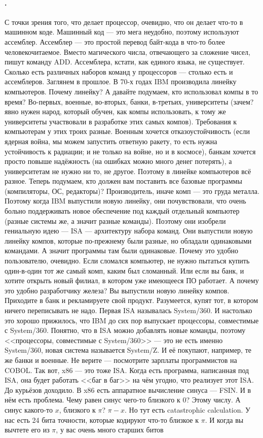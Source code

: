\documentclass{article}
\begin{document}
    \paragraph{.}
    С точки зрения того, что делает процессор, очевидно, что он делает что-то в машинном коде. Машинный код --- это мега неудобно, поэтому используют ассемблер. Ассемблер --- это простой перевод байт-кода в что-то более человекочитаемое. Вместо магического числа, отвечающего за сложение чисел, пишут команду ADD. Ассемблера, кстати, как единого языка, не существует. Сколько есть различных наборов команд у процессоров --- столько есть и ассемблеров. Заглянем в прошлое. В 70-х годах IBM производила линейку компьютеров. Почему линейку? А давайте подумаем, кто использовал компы в то время? Во-первых, военные, во-вторых, банки, в-третьих, университеты (зачем? явно нужен народ, который обучен, как компы использовать, к тому же университеты участвовали в разработке этих самых компов). Требования к компьютерам у этих троих разные. Военным хочется отказоустойчивость (если ядерная война, мы можем запустить ответную ракету, то есть нужна устойчивость к радиации; и не только на войне, но и в космосе), банкам хочется просто повыше надёжность (на ошибках можно много денег потерять), а университетам не нужно ни то, не другое. Поэтому в линейке компьютеров всё разное. Теперь подумаем, кто должен вам поставить все базовые программы (компиляторы, ОС, редакторы)? Производитель, иначе комп --- это груда металла. Поэтому когда IBM выпустили новую линейку, они почувствовали, что очень больно поддерживать новое обеспечение под каждый отдельный компьютер (разные системы же, а значит разные команды). Поэтому они изобрели гениальную идею --- ISA --- архитектуру набора команд. Они выпустили новую линейку компов, которые по-прежнему были разные, но обладали одинаковыми командами. А значит программы там были одинаковые. Почему это удобно пользователю, очевидно. Если сломался компьютер, не нужно пытаться купить один-в-один тот же самый комп, каким был сломанный. Или если вы банк, и хотите открыть новый филиал, в котором уже имеющееся ПО работает. А почему это удобно разработчику железа? Вы выпустили новую линейку компов. Приходите в банк и рекламируете свой продукт. Разумеется, купят тот, в котором ничего переписывать не надо. Первая ISA называлась System/360. И настолько это хорошо прижилось, что IBM до сих пор выпускает процессоры, совместимые с System/360. Понятно, что в ISA можно добавлять новые команды, поэтому <<процессоры, совместимые с System/360>> --- это не есть именно System/360, новая система называется System/Z. И её покупают, например, те же банки и военные. Не верите --- посмотрите зарплаты программистов на COBOL. Так вот, x86 --- это тоже ISA. Когда есть программа, написанная под ISA, она будет работать <<баг в баг>> на чём угодно, что реализует этот ISA. До курьёзов доходило. В x86 есть аппаратное вычисление синуса --- FSIN. И в нём есть проблема. Чему равен синус чего-то близкого к 0? Этому числу. А синус какого-то $x$, близкого к $\pi$? $\pi-x$. Но тут есть catastrophic calculation. У нас есть 24 бита точности, которые кодируют что-то близкое к $\pi$. И когда вы вычтете его из $\pi$, у вас очень много старших битов 
\end{document}
